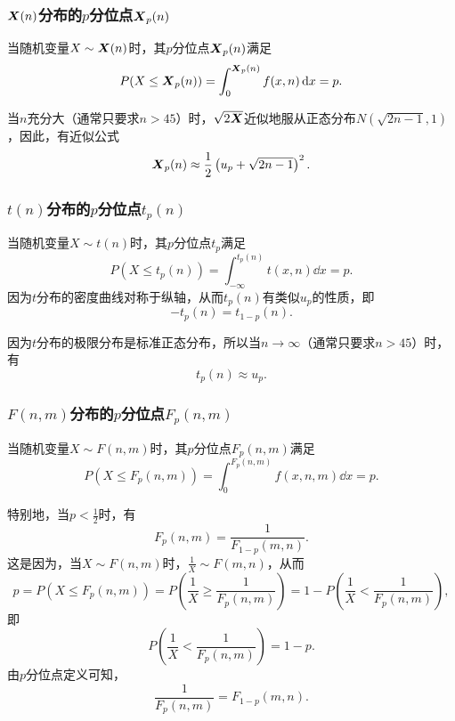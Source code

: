 \subsubsection{\texorpdfstring{\(\boldsymbol{X}(n)\)分布的\(p\)分位点\(\boldsymbol{X}_p(n)\)}{卡方分布的p分位点}}
当随机变量\(X \sim \boldsymbol{X}(n)\)时，其\(p\)分位点\(\boldsymbol{X}_p(n)\)满足\[
P(X \leq \boldsymbol{X}_p(n)) = \int_0^{\boldsymbol{X}_p(n)} f(x,n) \dd{x} = p.
\]

当\(n\)充分大（通常只要求\(n>45\)）时，\(\sqrt{2\boldsymbol{X}}\)近似地服从正态分布\(N(\sqrt{2n-1},1)\)，因此，有近似公式\begin{equation}
\boldsymbol{X}_p(n) \approx \frac{1}{2}\left(u_p+\sqrt{2n-1}\right)^2.
\end{equation}

\subsubsection{\texorpdfstring{\(t(n)\)分布的\(p\)分位点\(t_p(n)\)}{t分布的p分位点}}
当随机变量\(X \sim t(n)\)时，其\(p\)分位点\(t_p\)满足\[
P(X \leq t_p(n))
= \int_{-\infty}^{t_p(n)} t(x,n) \dd{x} = p.
\]因为\(t\)分布的密度曲线对称于纵轴，从而\(t_p(n)\)有类似\(u_p\)的性质，即\begin{equation}
-t_p(n)=t_{1-p}(n).
\end{equation}

因为\(t\)分布的极限分布是标准正态分布，所以当\(n\to\infty\)（通常只要求\(n>45\)）时，有\[
t_p(n) \approx u_p.
\]

\subsubsection{\texorpdfstring{\(F(n,m)\)分布的\(p\)分位点\(F_p(n,m)\)}{F分布的p分位点}}
当随机变量\(X \sim F(n,m)\)时，其\(p\)分位点\(F_p(n,m)\)满足\[
P(X \leq F_p(n,m)) = \int_0^{F_p(n,m)} f(x,n,m) \dd{x} = p.
\]

特别地，当\(p<\frac{1}{2}\)时，有\begin{equation}
F_p(n,m) = \frac{1}{F_{1-p}(m,n)}.
\end{equation}
这是因为，当\(X \sim F(n,m)\)时，\(\frac{1}{X} \sim F(m,n)\)，从而\[
p = P(X \leq F_p(n,m))
= P\left(\frac{1}{X} \geq \frac{1}{F_p(n,m)}\right)
= 1 - P\left(\frac{1}{X} < \frac{1}{F_p(n,m)}\right),
\]即\[
P\left(\frac{1}{X} < \frac{1}{F_p(n,m)}\right) = 1 - p.
\]由\(p\)分位点定义可知，\[
\frac{1}{F_p(n,m)} = F_{1-p}(m,n).
\]

